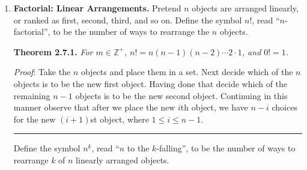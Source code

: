 \documentclass[10pt, AMS Euler]{article}
\newcommand{\Z}{\mathbb{Z}}
\newcommand{\N}{\mathbb{N}}
\begin{document}
\begin{enumerate}
{\bf Pascal's Triangle.} The binomial coefficient $\binom{n}{k}$ satisfies the following relationship, which gives a way to determine any
binomial coefficient from other binomial coefficients with smaller upper and lower indexes.  In other terms, the theorem defines $\binom{n}{k}$
\emph{recursively}. 

{\bf Theorem 2.9.1.} (Pascal's Identity) \emph{For $n,k \in \N$ and $n \geq 1$, $\binom{n}{k} = \binom{n-1}{k-1}+ \binom{n-1}{k}$.}

Pascal's Identity yields a way to display the binomial coefficients in a triangular array, using the facts $\binom{n}{0}= \binom{n}{n} = 1$
and $\binom{n}{k} = 0$ if $k > n$.

\emph{Proof of Pascal's Identity}: Suppose you have $n-1$ objects and a llama --- so $n$ objects in total, one of which happens to be a llama.
How many $k$-sets can you create from these $n$ objects?  By definition, $\binom{n}{k}$.  But we could condition on the llama and whether or not
we want it in the $k$-set. If we don't, there are $\binom{n-1}{k}$ ways to create a $k$-set with no llama, since we
simply disregard the llama during the selection process.  If we want the llama, then we put the llama in the set and then
select the remaining $k-1$ objects from $n-1$ other non-llama objects.  In all we have $\binom{n-1}{k}+\binom{n-1}{k-1}$ to build a $k$-set
if we condition on the llama.  But in the end we still have a $k$-set selected from $n$ objects, and the identity is established.  Note that we needed
at least one object -- the llama -- to make this argument. \hfill \rule{2mm}{2mm}

\item{\bf Factorial: Linear Arrangements.} Pretend $n$ objects are arranged linearly, or ranked as first, second, third, and so on.
Define the symbol $n!$, read ``$n$-factorial'', to be the number of ways to rearrange the $n$ objects.

{\bf Theorem 2.7.1.} \emph{For $m \in \Z^+$, $n! = n(n-1)(n-2) \cdots 2 \cdot 1$, and $0! =1$.}

\emph{Proof}: Take the $n$ objects and place them in a set.  Next decide which of the $n$ objects is to be the new first object.  Having
done that decide which of the remaining $n-1$  objects is to be the new second object.  Continuing in this manner observe that after
we place the new $i$th object, we have $n-i$ choices for the new $(i+1)$st object, where $1 \leq i \leq n-1$. \hfill \rule{2mm}{2mm}

Define the symbol $n^{\underline{k}}$, read ``$n$ to the $k$-falling'', to be the number of ways to rearrange $k$ of $n$ linearly arranged
objects.


\end{enumerate}
\end{document}

